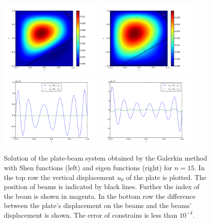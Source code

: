 \documentclass{marine_2015}
\begin{document}
 \begin{figure}[t!]
 \centering
 \includegraphics[width=0.45\textwidth]{img/shen_u0}
 \includegraphics[width=0.45\textwidth]{img/sine_u0}\\
 \includegraphics[width=0.45\textwidth]{img/shen_u0_ur}
 \includegraphics[width=0.45\textwidth]{img/sine_u0_ur}\\
 \caption{
  Solution of the plate-beam system obtained by the Galerkin method with Shen
  functions (left) and eigen functions (right) for $n=15$. In the top row the vertical
  displacement $u_0$ of the plate is plotted. The position of beams is indicated
  by black lines. Further the index of the beam is shown in magenta. In the
  bottom row the difference between the plate's displacement on the beams and the
  beams' displacement is shown. The error of constrains is less than $10^{-4}$.
 }
 \label{fig:solutions}
 \end{figure}
\end{document}
